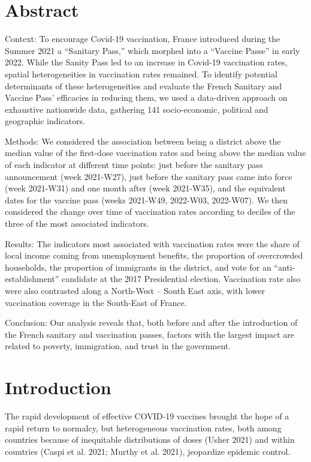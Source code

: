 \documentclass[
]{article}
\begin{document}
\hypertarget{abstract}{%
\section{Abstract}\label{abstract}}

Context: To encourage Covid-19 vaccination, France introduced during the Summer 2021 a ``Sanitary Pass,'' which morphed into a ``Vaccine Passe'' in early 2022. While the Sanity Pass led to an increase in Covid-19 vaccination rates, spatial heterogeneities in vaccination rates remained. To identify potential determinants of these heterogeneities and evaluate the French Sanitary and Vaccine Pass' efficacies in reducing them, we used a data-driven approach on exhaustive nationwide data, gathering 141 socio-economic, political and geographic indicators.

Methods: We considered the association between being a district above the median value of the first-dose vaccination rates and being above the median value of each indicator at different time points: just before the sanitary pass announcement (week 2021-W27), just before the sanitary pass came into force (week 2021-W31) and one month after (week 2021-W35), and the equivalent dates for the vaccine pass (weeks 2021-W49, 2022-W03, 2022-W07). We then considered the change over time of vaccination rates according to deciles of the three of the most associated indicators.

Results: The indicators most associated with vaccination rates were the share of local income coming from unemployment benefits, the proportion of overcrowded households, the proportion of immigrants in the district, and vote for an ``anti-establishment'' candidate at the 2017 Presidential election. Vaccination rate also were also contrasted along a North-West -- South East axis, with lower vaccination coverage in the South-East of France.

Conclusion: Our analysis reveals that, both before and after the introduction of the French sanitary and vaccination passes, factors with the largest impact are related to poverty, immigration, and trust in the government.

\hypertarget{introduction}{%
\section{Introduction}\label{introduction}}

The rapid development of effective COVID-19 vaccines brought the hope of a rapid return to normalcy, but heterogeneous vaccination rates, both among countries because of inequitable distributions of doses (Usher 2021) and within countries (Caspi et al. 2021; Murthy et al. 2021), jeopardize epidemic control.
\end{document}
